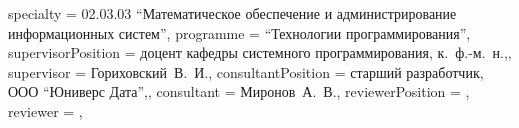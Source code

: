 {    %
    specialty          = {02.03.03 \enquote{Математическое обеспечение и администрирование информационных систем}},
    programme          = {\enquote{Технологии программирования}},
    supervisorPosition = {доцент кафедры системного программирования, к.~ф.-м.~н.,},
    supervisor         = {Гориховский~В.~И.},
    consultantPosition = {старший разработчик, ООО \enquote{Юниверс Дата},},
    consultant         = {Миронов~А.~В.},
    reviewerPosition   = {},
    reviewer           = {},
}

